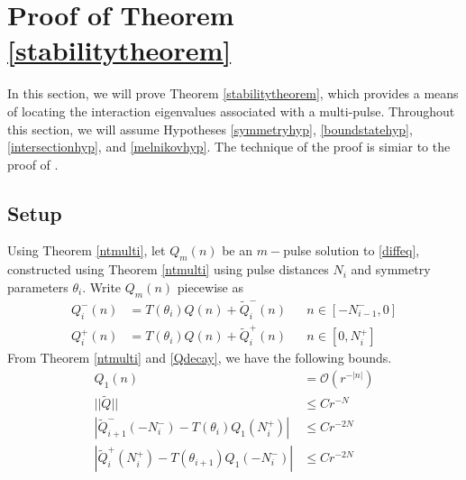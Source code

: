 \documentclass[12pt]{elsarticle}
\begin{document}
\section{Proof of Theorem \ref{stabilitytheorem}}

In this section, we will prove Theorem \ref{stabilitytheorem}, which provides a means of locating the interaction eigenvalues associated with a multi-pulse. Throughout this section, we will assume Hypotheses \ref{symmetryhyp}, \ref{boundstatehyp}, \ref{intersectionhyp}, and \ref{melnikovhyp}. The technique of the proof is simiar to the proof of \cite[Theorem 2]{Sandstede1998}.

\subsection{Setup}

Using Theorem \ref{ntmulti}, let $Q_m(n)$ be an $m-$pulse solution to \eqref{diffeq}, constructed using Theorem \ref{ntmulti} using pulse distances $N_i$ and symmetry parameters $\theta_i$. Write $Q_m(n)$ piecewise as
\begin{equation}\label{Qmpiecewise}
\begin{aligned}
Q_i^-(n) &= T(\theta_i) Q(n) + \tilde{Q}_i^-(n) && n \in [-N_{i-1}^-, 0] \\
Q_i^+(n) &= T(\theta_i) Q(n) + \tilde{Q}_i^+(n) && n \in [0, N_i^+]
\end{aligned}
\end{equation}
From Theorem \ref{ntmulti} and \eqref{Qdecay}, we have the following bounds.
\begin{equation}\label{stabbounds1}
\begin{aligned}
Q_1(n) &= \mathcal{O}(r^{-|n|}) \\
||\tilde{Q}|| &\leq C r^{-N} \\
|\tilde{Q}_{i+1}^-(-N_i^-) - T(\theta_i) Q_1(N_i^+)| &\leq C r^{-2N} \\
|\tilde{Q}_i^+(N_i^+) - T(\theta_{i+1}) Q_1(-N_i^-)| &\leq C r^{-2N} \\
\end{aligned}
\end{equation}
\end{document}
